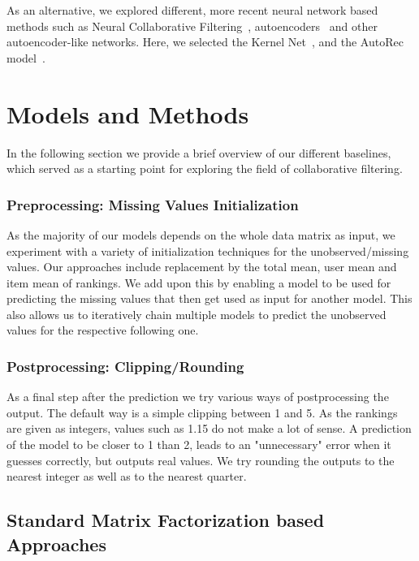 \documentclass[10pt,conference,compsocconf]{IEEEtran}
\begin{document}
    As an alternative, we explored different, more recent neural network based methods such as Neural Collaborative Filtering~\cite{DBLP:journals/corr/abs-1708-05031}, autoencoders~\cite{inproceedings} and other autoencoder-like networks.
    Here, we selected the Kernel Net~\cite{pmlr-v80-muller18a}, and the AutoRec model~\cite{inproceedings}.


    \section{Models and Methods}
    In the following section we provide a brief overview of our different baselines, which served as a starting point for exploring the field of collaborative filtering.

    \subsubsection{Preprocessing: Missing Values Initialization}\label{subsub:missing_init}
    As the majority of our models depends on the whole data matrix as input, we experiment with a variety of initialization techniques for the unobserved/missing values.
    Our approaches include replacement by the total mean, user mean and item mean of rankings.
    We add upon this by enabling a model to be used for predicting the missing values that then get used as input for another model.
    This also allows us to iteratively chain multiple models to predict the unobserved values for the respective following one.

    \subsubsection{Postprocessing: Clipping/Rounding}
    As a final step after the prediction we try various ways of postprocessing the output.
    The default way is a simple clipping between 1 and 5.
    As the rankings are given as integers, values such as 1.15 do not make a lot of sense.
    A prediction of the model to be closer to 1 than 2, leads to an "unnecessary" error when it guesses correctly, but outputs real values.
    We try rounding the outputs to the nearest integer as well as to the nearest quarter.

    \subsection{Standard Matrix Factorization based Approaches}
\end{document}
